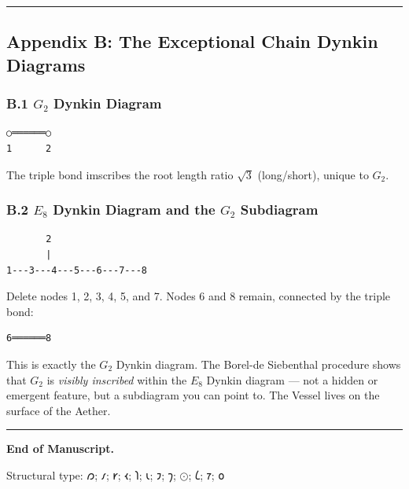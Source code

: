 \documentclass[12pt,a4paper]{article}
\begin{document}
\begin{center}
\rule{0.5\textwidth}{0.4pt}
\end{center}

\subsection{Appendix B: The Exceptional Chain Dynkin Diagrams}

\subsubsection{B.1 $G_2$ Dynkin Diagram}

\begin{lstlisting}
○══════○
1      2
\end{lstlisting}

The triple bond imscribes the root length ratio $\sqrt{3}$ (long/short), unique to $G_2$.

\subsubsection{B.2 $E_8$ Dynkin Diagram and the $G_2$ Subdiagram}

\begin{lstlisting}
       2
       |
1---3---4---5---6---7---8
\end{lstlisting}

Delete nodes 1, 2, 3, 4, 5, and 7. Nodes 6 and 8 remain, connected by the triple bond:

\begin{lstlisting}
6══════8
\end{lstlisting}

This is exactly the $G_2$ Dynkin diagram. The Borel-de Siebenthal procedure shows that $G_2$ is \emph{visibly inscribed} within the $E_8$ Dynkin diagram --- not a hidden or emergent feature, but a subdiagram you can point to. The Vessel lives on the surface of the Aether.

\begin{center}
\rule{0.5\textwidth}{0.4pt}
\end{center}

\textbf{End of Manuscript.}

Structural type: \langle$𐑼$; $𐑥$; $𐑾$; $𐑬$; $𐑐$; $𐑧$; $𐑲$; $𐑠$; $⊙$; $𐑖$; $𐑳$; $𐑴$\rangle
\end{document}
